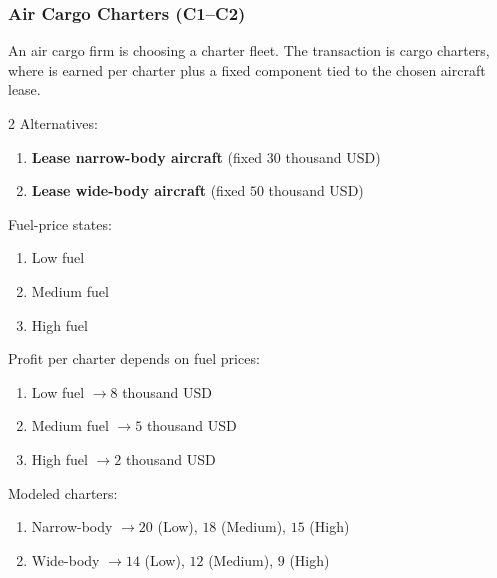 
	\subsubsection{Air Cargo Charters (C1--C2)}
	\label{sec:problem21-air-cargo-charters-c1-c2}
	An air cargo firm is choosing a charter fleet. The transaction is cargo charters, where  is earned per charter plus a fixed  component tied to the chosen aircraft lease.

	\begin{multicols}{2}
		Alternatives:
		\begin{enumerate}[label=\arabic*.]
			\item \textbf{Lease narrow-body aircraft} (fixed  $30$ thousand USD)
			\item \textbf{Lease wide-body aircraft} (fixed  $50$ thousand USD)
		\end{enumerate}

		Fuel-price states:
		\begin{enumerate}[label=\arabic*.]
			\item Low fuel 
			\item Medium fuel 
			\item High fuel 
		\end{enumerate}

			\columnbreak

		Profit per charter depends on fuel prices:
		\begin{enumerate}[label=\arabic*.]
			\item Low fuel $\to 8$ thousand USD
			\item Medium fuel $\to 5$ thousand USD
			\item High fuel $\to 2$ thousand USD
		\end{enumerate}

		Modeled charters:
		\begin{enumerate}[label=\arabic*.]
			\item Narrow-body $\to 20$ (Low), $18$ (Medium), $15$ (High)
			\item Wide-body $\to 14$ (Low), $12$ (Medium), $9$ (High)
		\end{enumerate}
	\end{multicols}


